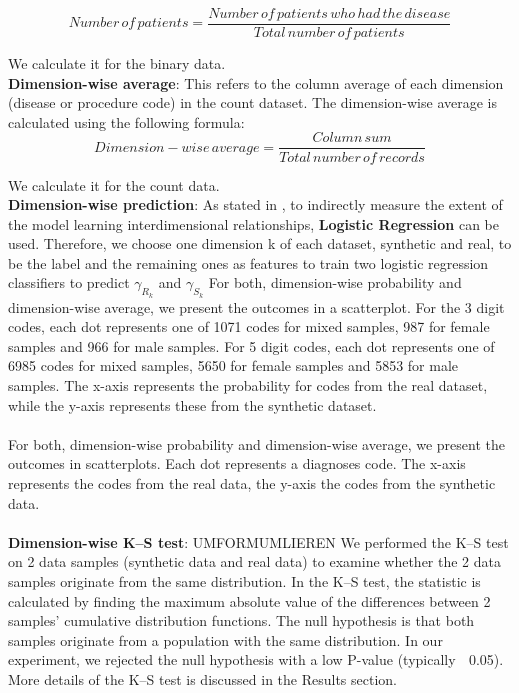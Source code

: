 \documentclass[11pt, a4paper]{book}
\begin{document}
\begin{equation}
Number\,of\,patients = \frac{Number\,of\,patients\, who \,had \,the \,disease}{Total \,number \,of \,patients}
\end{equation}

We calculate it for the binary data.
\\

\textbf{Dimension-wise average}: This refers to the column average of each dimension (disease or procedure code) in the count dataset. The dimension-wise average is calculated using the following formula: 
\begin{equation}
Dimension-wise\,average = \frac{Column \,sum}{Total \,number \,of \,records}
\end{equation}

We calculate it for the count data.
\\

\textbf{Dimension-wise prediction}: As stated in \cite{Choi2017}, to indirectly measure the extent of the model learning interdimensional relationships, \textbf{Logistic Regression} can be used. Therefore, we choose one dimension k of each dataset, synthetic and real, to be the label and the remaining  ones as features to train two logistic regression classifiers to predict $\gamma_R_k$ and $\gamma_S_k$
For both, dimension-wise probability and dimension-wise average, we present the outcomes in a scatterplot. For the 3 digit codes, each dot represents one of 1071 codes for mixed samples, 987 for female samples and 966 for male samples. For 5 digit codes, each dot represents one of 6985 codes for mixed samples, 5650 for female samples and 5853 for male samples. The x-axis represents the probability for codes from the real dataset, while the y-axis represents these from the synthetic dataset.
\\
\\
For both, dimension-wise probability and dimension-wise average, we present the outcomes in scatterplots. Each dot represents a diagnoses code. The x-axis represents the codes from the real data, the y-axis the codes from the synthetic data.
\\
\\
\textbf{Dimension-wise K–S test}: UMFORMUMLIEREN We performed the K–S test on 2 data samples (synthetic data and real data) to examine whether the 2 data samples originate from the same distribution. In the K–S test, the statistic is calculated by finding the maximum absolute value of the differences between 2 samples’ cumulative distribution functions. The null hypothesis is that both samples originate from a population with the same distribution. In our experiment, we rejected the null hypothesis with a low P-value (typically 􏰆 0.05). More details of the K–S test is discussed in the Results section. 
\\
\end{document}
